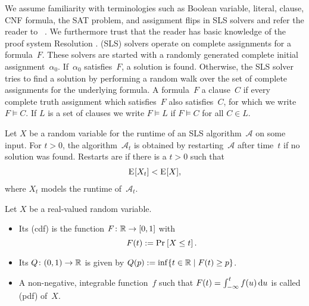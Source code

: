 

We assume familiarity with terminologies such as Boolean variable, literal, clause, CNF formula, the SAT problem, and assignment flips in SLS solvers and refer the reader to \egcite~\cite{ST13SATProblem}.
We furthermore trust that the reader has basic knowledge of the proof system Resolution \cite{Blake37Canoncial,Robinson65Machine-oriented}.
 (SLS) solvers operate on complete assignments for a formula~$F$.
These solvers are started with a randomly generated complete initial assignment~$\alpha_0$.
If~$\alpha_0$ satisfies~$F$, a solution is found.
Otherwise, the SLS solver tries to find a solution by performing a random walk over the set of complete assignments for the underlying formula.
A formula~$F$  a clause~$C$ if every complete truth assignment which satisfies~$F$ also satisfies~$C$, for which we write $F \vDash C$. If $L$ is a set of clauses we write $F \vDash L$ if $F \vDash C$ for all $C \in L$.







\begin{definition}
	\label{def:RestartsUseful}
	Let $X$ be a random variable 
	for
	the runtime of an 
	SLS 
	algorithm~$\mathcal{A}$ on some input.
	For $t > 0$, the algorithm~$\mathcal{A}_t$
	is obtained by restarting~$\mathcal{A}$ after time~$t$ if no solution was found. %
	Restarts are  if there is a $t > 0$ %
	such that
	\begin{align*}
		\expectation{X_t} < \expectation{X},
	\end{align*}
	where $X_t$ models the runtime of~$\mathcal{A}_t$. 
\end{definition}




\begin{definition}
	\label{def:cdf_quantile}
	Let $X$ be a real-valued random variable.
	\begin{itemize}
	\item
		Its 
		(cdf) %
		is the function $F \colon \R \to [0,1]$ with 
			\[
			F(t) := \prob{X \leq t}. %
			\]
	\item
		Its  $Q \colon (0,1) \to \R$ is given by $Q(p) := \inf \setdescr{t \in \R}{F(t) \geq p}$.
	\item
		A non-negative, integrable function~$f$ such that 
		$F(t) = \integralLow[u]{-\infty}{t}{f(u)}$
		is 
		called 
		 (pdf) of~$X$.
	\end{itemize}
\end{definition}








